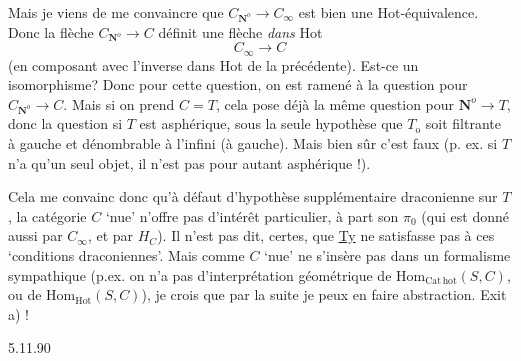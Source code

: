 \documentclass[11pt]{article}
\newcommand{\printedpage}[1]{\marginpar{\footnotesize p.~#1}}
\newcommand{\msp}[1]{\marginpar{\footnotesize [#1]}}
\newcommand{\CNo}{C_{\mathbf{N}^{o}}}
\begin{document}
Mais je viens de me convaincre que $\CNo \longrightarrow C_{\infty}$ est bien une Hot-équivalence. Donc la flèche $\CNo \longrightarrow C$ définit une flèche \textit{dans} Hot
\[
C_{\infty} \longrightarrow C
\]
(en composant avec l'inverse dans Hot de la précédente). Est-ce un isomorphisme? Donc pour cette question, on est ramené à la question pour $\CNo \longrightarrow C$. Mais si on prend $C = T$, cela pose déjà la même question pour $\mathbf{N}^{o} \longrightarrow T$, donc la question si $T$ est asphérique, sous la seule hypothèse que $T_{\mathrm{o}}$ soit filtrante à gauche et dénombrable à l'infini (à gauche). Mais bien sûr c'est faux (p. ex. si $T$ n'a qu'un seul objet, il n'est pas pour autant asphérique !).

Cela me convainc donc qu'à défaut
\printedpage{70}
\msp{page 110}
d'hypothèse supplémentaire draconienne sur $T$, la catégorie $C$ `nue' n'offre pas d'intérêt particulier, à part son $\pi_{0}$ (qui est donné aussi par $C_{\infty}$, et par $H_{C}$). Il n'est pas dit, certes, que \underline{Ty} ne satisfasse pas à ces `conditions draconiennes'. Mais comme $C$ `nue' ne s'insère pas dans un formalisme sympathique (p.ex. on n'a pas d'interprétation géométrique de $\mathrm{Hom}_{\mathrm{Cat\,hot}}(S,C)$, ou de $\mathrm{Hom}_{\mathrm{Hot}}(S,C)$), je crois que par la suite je peux en faire abstraction. Exit a) !

\begin{flushright}
{\footnotesize 5.11.90}
\end{flushright}
\end{document}
